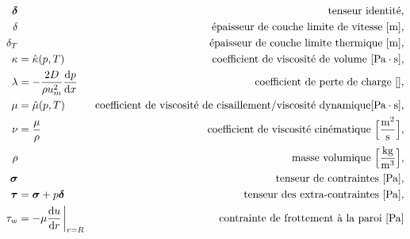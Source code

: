 \begin{align*}
      \bs{\delta} & & \textrm{tenseur identité},\\
      \delta & & \textrm{épaisseur de couche limite de vitesse } [\si{m}],\\
      \delta_T & & \textrm{épaisseur de couche limite thermique } [\si{m}],\\
      \kappa &= \hat{\kappa}(p, T) & \textrm{coefficient de viscosité de volume } [\si{Pa \cdot s}],\\
      \lambda &= -\frac{2D}{\rho u_m^2} \dv{p}{x} & \textrm{coefficient de perte de charge } [],\\
      \mu &= \hat{\mu}(p,T) & \textrm{coefficient de viscosité de cisaillement/viscosité dynamique} [\si{Pa \cdot s}],\\
      \nu &= \frac{\mu}{\rho} & \textrm{coefficient de viscosité cinématique } \Big[\si{\frac{m^2}{s}} \Big], \\
      \rho & & \textrm{masse volumique } \Big[\si{\frac{kg}{m^3}}\Big],\\
      \bs{\sigma} & & \textrm{tenseur de contraintes } [\si{Pa} ],\\
      \bs{\tau} &= \bs{\sigma} + p \bs{\delta} & \textrm{tenseur des extra-contraintes } [\si{Pa}],\\
      \tau_w &= -\mu \dv{u}{r}\eval_{r=R} & \textrm{contrainte de frottement à la paroi } [\si{Pa}]
    \end{align*}
  \endgroup

